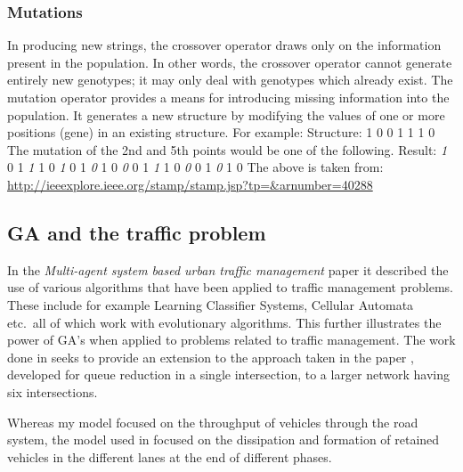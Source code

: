 \documentclass[a4paper,10pt]{article}
\begin{document}
\subsubsection{Mutations}
In producing new strings, the crossover operator draws only on the information present in the population. In other words, the crossover
operator cannot generate entirely new genotypes; it may only deal with genotypes which already exist. The mutation operator provides a
means for introducing missing information into the population. It generates a new structure by modifying the values of one or more 
positions (gene) in an existing structure. For example:
\newline
\newline
Structure: 1 0 0 1 1 1 0
\newline
\newline
The mutation of the 2nd and 5th points would be one of the following.
\newline
\newline
Result: \emph{1} 0 1 \emph{1} 1 0 \emph{1} 0 1 \emph{0} 1 0 \emph{0} 0 1 \emph{1} 1 0 \emph{0} 0 1 \emph{0} 1 0
\newline
\newline
The above is taken from:
\url{http://ieeexplore.ieee.org/stamp/stamp.jsp?tp=&arnumber=40288}

\subsection{GA and the traffic problem}
In the \emph{Multi-agent system based urban traffic management} \cite{Multi-agent} paper it described the use of various algorithms that
have been applied to traffic management problems. These include for example Learning Classifier Systems, Cellular Automata etc.\ all of
which work with evolutionary algorithms. This further illustrates the power of GA’s when applied to problems related to traffic 
management. The work done in \cite{Multi-agent} seeks to provide an extension to the approach taken in the paper \cite{realcode},
developed for queue reduction in a single intersection, to a larger network having six intersections.

Whereas my model focused on the throughput of vehicles through the road system, the model used in \cite{Multi-agent} focused on the 
dissipation and formation of retained vehicles in the different lanes at the end of different phases.
\newline
\end{document}

